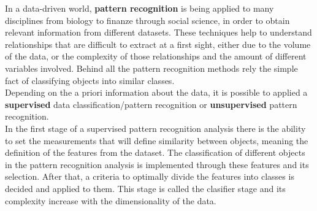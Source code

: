


In a data-driven world, \textbf{pattern recognition} is being applied to many disciplines from biology to finanze through social science, in order to obtain relevant information from different datasets. These techniques help to understand relationships that are difficult to extract at a first sight, either due to the volume of the data, or the complexity of those relationships and the amount of different variables involved. Behind all the pattern recognition methods rely the simple fact of classifying objects into similar classes.\\

Depending on the a priori information about the data, it is possible to applied a \textbf{supervised} data classification/pattern recognition or \textbf{unsupervised} pattern recognition.\\

In the first stage of a supervised pattern recognition analysis there is the ability to set the measurements that will define similarity between objects, meaning the definition of the features from the dataset. The classification of different objects in the pattern recognition analysis is implemented through these features and its selection. After that, a criteria to optimally divide the features into classes is decided and applied to them. This stage is called the clasifier stage and its complexity increase with the dimensionality of the data.\\

